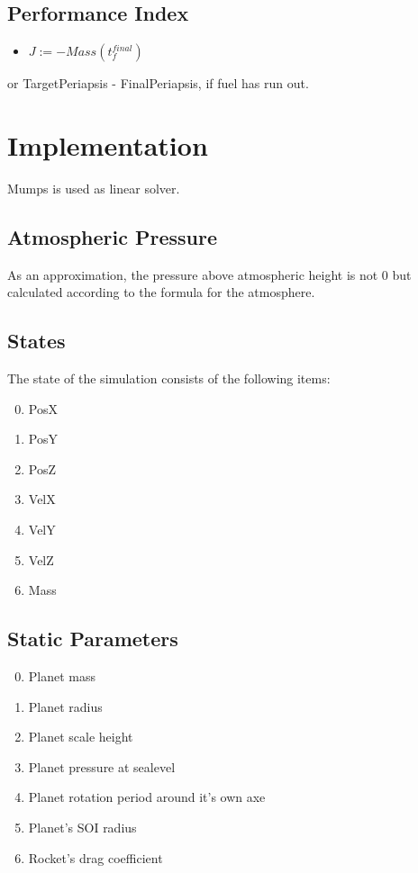 \documentclass[11pt]{report}
\begin{document}
\section{Performance Index}

\begin{itemize}
\item $J := - Mass(t_f^{final})$
\end{itemize}
or TargetPeriapsis - FinalPeriapsis, if fuel has run out.

\chapter{Implementation}

Mumps is used as linear solver.

\section{Atmospheric Pressure}

As an approximation, the pressure above atmospheric height is not 0
but calculated according to the formula for the atmosphere.

\section{States}

The state of the simulation consists of the following items:

\begin{enumerate}
\setcounter{enumi}{-1}
\item PosX
\item PosY
\item PosZ
\item VelX
\item VelY
\item VelZ
\item Mass
\end{enumerate}

\section{Static Parameters}

\begin{enumerate}
\setcounter{enumi}{-1}
\item Planet mass
\item Planet radius
\item Planet scale height
\item Planet pressure at sealevel
\item Planet rotation period around it's own axe
\item Planet's SOI radius
\item Rocket's drag coefficient
\end{enumerate}
\end{document}
